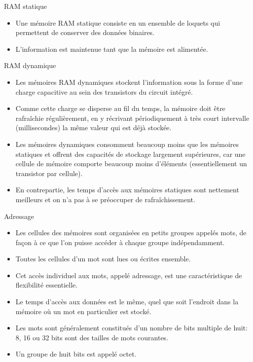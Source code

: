 \documentclass[presentation]{beamer}
\begin{document}
\begin{frame}[label={sec:org3f14c14}]{RAM statique}
\begin{itemize}
\item Une mémoire RAM \alert{statique} consiste en un ensemble de loquets qui permettent de conserver des données binaires.

\item L'information est maintenue tant que la mémoire est alimentée.
\end{itemize}
\end{frame}

\begin{frame}[label={sec:orgc4d8567}]{RAM dynamique}
\begin{itemize}
\item Les mémoires RAM \alert{dynamiques} stockent l'information sous la forme d'une charge capacitive au sein des transistors du circuit intégré.

\item Comme cette charge se disperse au fil du temps, la mémoire doit être rafraîchie régulièrement, en y récrivant périodiquement à très court intervalle (millisecondes) la même valeur qui est déjà stockée.

\item Les mémoires dynamiques consomment beaucoup moins que les mémoires statiques et offrent des capacités de stockage largement supérieures, car une cellule de mémoire comporte beaucoup moins d'éléments (essentiellement un transistor par cellule).

\item En contrepartie, les temps d'accès aux mémoires statiques sont nettement meilleurs et on n'a pas à se préoccuper de rafraîchissement.
\end{itemize}
\end{frame}

\begin{frame}[label={sec:org25161f3}]{Adressage}
\begin{itemize}
\item Les cellules des mémoires sont organisées en petits groupes appelés \alert{mots}, de façon à ce que l'on puisse accéder à chaque groupe indépendamment.

\item Toutes les cellules d'un mot sont lues ou écrites ensemble.

\item Cet accès individuel aux mots, appelé \alert{adressage}, est une caractéristique de flexibilité essentielle.

\item Le temps d'accès aux données est le même, quel que soit l'endroit dans la mémoire où un mot en particulier est stocké.

\item Les mots sont généralement constitués d'un nombre de bits multiple de huit: 8, 16 ou 32 bits sont des tailles de mots courantes.

\item Un groupe de huit bits est appelé \alert{octet}.
\end{itemize}
\end{frame}
\end{document}

